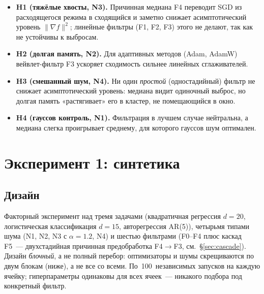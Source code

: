 \documentclass[conference]{IEEEtran}
\begin{document}
\begin{itemize}
  \item \textbf{H1 (тяжёлые хвосты, N3).} Причинная медиана F4 переводит
        SGD из расходящегося режима в сходящийся и заметно снижает
        асимптотический уровень $\|\nabla f\|^2$; линейные фильтры
        (F1, F2, F3) этого не делают, так как не устойчивы к выбросам.
  \item \textbf{H2 (долгая память, N2).} Для адаптивных методов (Adam,
        AdamW) вейвлет-фильтр F3 ускоряет сходимость сильнее линейных
        сглаживателей.
  \item \textbf{H3 (смешанный шум, N4).} Ни один \emph{простой}
        (одностадийный) фильтр не снижает асимптотический уровень: медиана видит
        одиночный выброс, но долгая память «растягивает» его в кластер,
        не помещающийся в окно.
  \item \textbf{H4 (гауссов контроль, N1).} Фильтрация в лучшем случае
        нейтральна, а медиана слегка проигрывает среднему, для которого
        гауссов шум оптимален.
\end{itemize}

\section{Эксперимент 1: синтетика}
\label{sec:exp1}

\subsection{Дизайн}

Факторный эксперимент над тремя задачами (квадратичная регрессия
$d=20$, логистическая классификация $d=15$, авторегрессия AR(5)),
четырьмя типами шума (N1, N2, N3 с $\alpha=1.2$, N4) и шестью фильтрами
(F0--F4 плюс каскад F5~--- двухстадийная причинная предобработка
F4$\to$F3, см.\ §\ref{sec:cascade}). Дизайн \emph{блочный}, а не полный
перебор: оптимизаторы и шумы скрещиваются по двум блокам (ниже), а не все
со всеми. По~100~независимых запусков на каждую
ячейку; гиперпараметры
одинаковы для всех ячеек~--- никакого подбора под конкретный фильтр.
\end{document}
